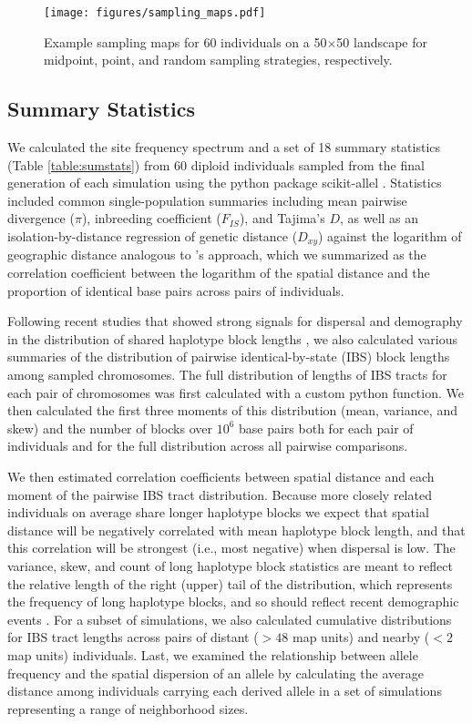\documentclass[10pt,twoside,lineno,hidelinks]{preprint}
\begin{document}
\begin{figure}[htbp]
\centering
\texttt{[image: figures/sampling\_maps.pdf]}
\caption{Example sampling maps for 60 individuals on a 50$\times$50 landscape for midpoint, point, and random sampling strategies, respectively.}
\label{fig:samplemap}
\end{figure}

\subsection{Summary Statistics}
We calculated the site frequency spectrum and a set of 18 summary statistics (Table \ref{table:sumstats}) from 60 diploid individuals sampled from the final generation of each simulation using the python package scikit-allel \citep{Miles2017}. 
Statistics included common single-population summaries including mean pairwise divergence ($\pi$), inbreeding coefficient ($F_{IS}$), and Tajima's $D$, 
as well as an isolation-by-distance regression of genetic distance ($D_{xy}$) against the logarithm of geographic distance analogous to \cite{Rousset1997}'s approach, 
which we summarized as the correlation coefficient between the logarithm of the spatial distance and the proportion of identical base pairs across pairs of individuals. 

Following recent studies that showed strong signals for dispersal and demography in the distribution of shared haplotype block lengths \citep{Ringbauer2017,Baharian2016}, we also calculated various summaries of the distribution of pairwise identical-by-state (IBS) block lengths among sampled chromosomes. The full distribution of lengths of IBS tracts for each pair of chromosomes was first calculated with a custom python function. 
We then calculated the first three moments of this distribution (mean, variance, and skew) and the number of blocks over $10^6$ base pairs both for each pair of individuals and for the full distribution across all pairwise comparisons. 

We then estimated correlation coefficients between spatial distance and each moment of the pairwise IBS tract distribution. Because more closely related individuals on average share longer haplotype blocks we expect that spatial distance will be negatively correlated with mean haplotype block length, and that this correlation will be strongest (i.e., most negative) when dispersal is low. The variance, skew, and count of long haplotype block statistics are meant to reflect the relative length of the right (upper) tail of the distribution, which represents the frequency of long haplotype blocks, and so should reflect recent demographic events \citep{chapman2002effect}. For a subset of simulations, we also calculated cumulative distributions for IBS tract lengths across pairs of distant (${}>48$ map units) and nearby (${}<2$ map units) individuals. Last, we examined the relationship between allele frequency and the spatial dispersion of an allele by calculating the average distance among individuals carrying each derived allele in a set of simulations representing a range of neighborhood sizes.
\end{document}
